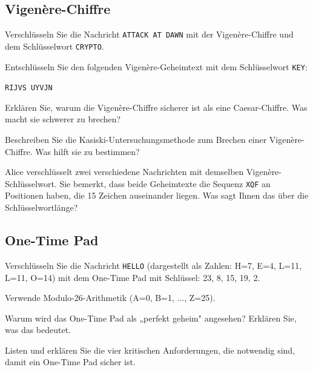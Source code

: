 \documentclass[11pt,a4paper]{report}
\begin{document}
\subsection{Vigenère-Chiffre}

\begin{ex}
Verschlüsseln Sie die Nachricht \texttt{ATTACK AT DAWN} mit der Vigenère-Chiffre und dem Schlüsselwort \texttt{CRYPTO}.
\end{ex}

\begin{ex}
Entschlüsseln Sie den folgenden Vigenère-Geheimtext mit dem Schlüsselwort \texttt{KEY}:

\texttt{RIJVS UYVJN}
\end{ex}

\begin{ex}
Erklären Sie, warum die Vigenère-Chiffre sicherer ist als eine Caesar-Chiffre. Was macht sie schwerer zu brechen?
\end{ex}

\begin{ex}
Beschreiben Sie die Kasiski-Untersuchungsmethode zum Brechen einer Vigenère-Chiffre. Was hilft sie zu bestimmen?
\end{ex}

\begin{ex}
Alice verschlüsselt zwei verschiedene Nachrichten mit demselben Vigenère-Schlüsselwort. Sie bemerkt, dass beide Geheimtexte die Sequenz \texttt{XQF} an Positionen haben, die 15 Zeichen auseinander liegen. Was sagt Ihnen das über die Schlüsselwortlänge?
\end{ex}

\subsection{One-Time Pad}

\begin{ex}
Verschlüsseln Sie die Nachricht \texttt{HELLO} (dargestellt als Zahlen: H=7, E=4, L=11, L=11, O=14) mit dem One-Time Pad mit Schlüssel: 23, 8, 15, 19, 2.

Verwende Modulo-26-Arithmetik (A=0, B=1, ..., Z=25).
\end{ex}

\begin{ex}
Warum wird das One-Time Pad als „perfekt geheim" angesehen? Erklären Sie, was das bedeutet.
\end{ex}

\begin{ex}
Listen und erklären Sie die vier kritischen Anforderungen, die notwendig sind, damit ein One-Time Pad sicher ist.
\end{ex}
\end{document}
